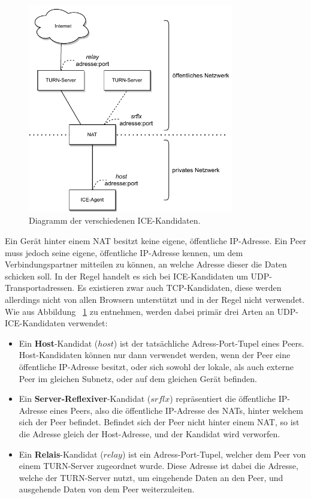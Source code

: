 \begin{figure}[h]
\centering
\includegraphics[width=0.80\textwidth]{bilder/PDF_SVG/CANDIDATES_OLD.pdf}
\caption{Diagramm der verschiedenen \acs{ICE}-Kandidaten.}
\label{fig:icecandidates}
\end{figure}

Ein Gerät hinter einem \acs{NAT} besitzt keine eigene, öffentliche \acs{IP}-Adresse. Ein Peer muss jedoch seine eigene, öffentliche \acs{IP}-Adresse kennen, um dem Verbindungspartner mitteilen zu können, an welche Adresse dieser die Daten schicken soll. In der Regel handelt es sich bei  \acs{ICE}-Kandidaten um \acs{UDP}-Transportadressen. Es existieren zwar auch \acs{TCP}-Kandidaten, diese werden allerdings nicht von allen Browsern unterstützt und in der Regel nicht verwendet. Wie aus Abbildung ~\ref{fig:icecandidates} zu entnehmen, werden dabei primär drei Arten an \acs{UDP}-\acs{ICE}-Kandidaten verwendet:

\begin{itemize}
	\item Ein \textbf{Host}-Kandidat ($host$) ist der tatsächliche Adress-Port-Tupel eines Peers. Host-Kandidaten können nur dann verwendet werden, wenn der Peer eine öffentliche \acs{IP}-Adresse besitzt, oder sich sowohl der lokale, als auch externe Peer im gleichen Subnetz, oder auf dem gleichen Gerät befinden.
	\item Ein \textbf{Server-Reflexiver}-Kandidat ($srflx$) repräsentiert die öffentliche \acs{IP}-Adresse eines Peers, also die öffentliche \acs{IP}-Adresse des \acs{NAT}s, hinter welchem sich der Peer befindet. Befindet sich der Peer nicht hinter einem \acs{NAT}, so ist die Adresse gleich der Host-Adresse, und der Kandidat wird verworfen.
	\item Ein \textbf{Relais}-Kandidat ($relay$) ist ein Adress-Port-Tupel, welcher dem Peer von einem \acs{TURN}-Server zugeordnet wurde. Diese Adresse ist dabei die Adresse, welche der \acs{TURN}-Server nutzt, um eingehende Daten an den Peer, und ausgehende Daten von dem Peer weiterzuleiten.
\end{itemize}

